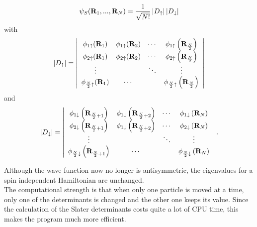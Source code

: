 \[
\psi_S(\mathbf{R}_1,...,\mathbf{R}_N) = \frac{1}{\sqrt{N!}} \left|D_{\uparrow}\right| \left|D_{\downarrow}\right|
\]
with
\[
\left|D_{\uparrow}\right| = \left|\begin{array}{cccc}
                           \phi_{1\uparrow}(\mathbf{R}_1) & \phi_{1\uparrow}(\mathbf{R}_2) &\cdots   & \phi_{1\uparrow}\left(\mathbf{R}_{\frac{N}{2}}\right) \\
                           \phi_{2\uparrow}(\mathbf{R}_1) & \phi_{2\uparrow}(\mathbf{R}_2) &\cdots & \phi_{2\uparrow}\left(\mathbf{R}_{\frac{N}{2}}\right) \\
                           \vdots &  & \ddots & \vdots\\
                       \phi_{\frac{N}{2}\uparrow}(\mathbf{R}_1)   &\cdots &  & \phi_{\frac{N}{2}\uparrow}\left(\mathbf{R}_{\frac{N}{2}}\right) \\
                      \end{array} \right|
\]
and
\[
\left|D_{\downarrow}\right| = \left|\begin{array}{cccc}
                           \phi_{1\downarrow}\left(\mathbf{R}_{\frac{N}{2}+1}\right) & \phi_{1\downarrow}\left(\mathbf{R}_{\frac{N}{2}+2}\right) &\cdots   & \phi_{1\downarrow}\left(\mathbf{R}_{N}\right) \\
                           \phi_{2\downarrow}\left(\mathbf{R}_{\frac{N}{2}+1}\right) & \phi_{1\downarrow}\left(\mathbf{R}_{\frac{N}{2}+2}\right) &\cdots & \phi_{2\downarrow}\left(\mathbf{R}_{N}\right) \\
                           \vdots &  & \ddots & \vdots\\
                       \phi_{\frac{N}{2}\downarrow}\left(\mathbf{R}_{\frac{N}{2}+1}\right)   &\cdots &  & \phi_{\frac{N}{2}\downarrow}\left(\mathbf{R}_{N}\right) \\
                      \end{array} \right|.
\]

Although the wave function now no longer is antisymmetric, the eigenvalues for a spin independent Hamiltonian are unchanged.\\
The computational strength is that when only one particle is moved at a time, only one of the determinants is changed and the other one keeps its value. Since the calculation of the Slater determinants costs quite a lot of CPU time, this makes the program much more efficient.

